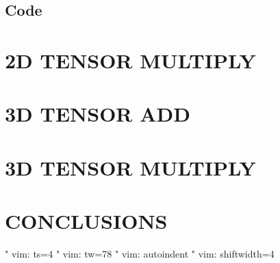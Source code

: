 \subsection{Code}

\section{2D TENSOR MULTIPLY}

\section{3D TENSOR ADD}

\section{3D TENSOR MULTIPLY}

\section{CONCLUSIONS}
\cite{1}
 




\clearpage
\appendix



" vim: ts=4
" vim: tw=78
" vim: autoindent
" vim: shiftwidth=4
